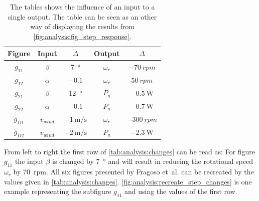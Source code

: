 \begin{table}[H]
    \caption{The tables shows the influence of an input to a single output. The table can be seen as an other way of displaying the results from \autoref{fig:analysis:fig_step_response}.}
    \centering
    \begin{tabular}{ccccc} \toprule
        Figure & Input & $\Delta$ & Output & $\Delta$ \\ \midrule
        $g_{11}$ & $\beta$    & \SI{7}{\degree}               & $\omega_r$  & $\SI{-70}{rpm}$ \\
        $g_{12}$ & $\alpha$   & $-0.1$                        & $\omega_r$  & $\SI{50}{rpm}$ \\
        $g_{21}$ & $\beta$    & \SI{12}{\degree}              & $P_g$       & $\SI{-0.5}{\watt}$ \\
        $g_{22}$ & $\alpha$   & $-0.1$                        & $P_g$       & $\SI{-0.7}{\watt}$ \\
        $g_{D1}$ & $v_{wind}$ & $\SI{-1}{\metre\per\second}$  & $\omega_r$  & $\SI{-300}{rpm}$ \\
        $g_{D2}$ & $v_{wind}$ & $\SI{-2}{\metre\per\second}$  & $P_g$       & $\SI{-2.3}{\watt}$ \\ \bottomrule
    \end{tabular}
    \label{tab:analysis:changes}
\end{table}

From left to right the first row of \autoref{tab:analysis:changes} can be read as: For figure $g_{11}$ the input $\beta$ is changed by \SI{7}{\degree} and will result in reducing the rotational speed $\omega_r$ by \SI{70}{rpm}.
All six figures presented by Fragoso et~al. can be recreated by the values given in \autoref{tab:analysis:changes}.
\autoref{fig:analysis:recreate_step_changes} is one example representing the subfigure $g_{11}$ and using the values of the first row.

